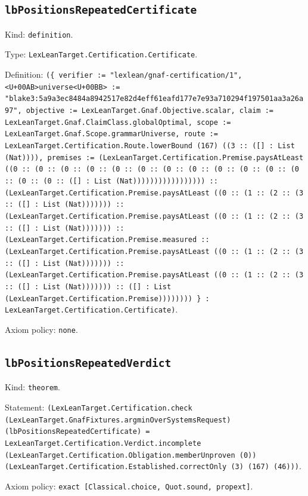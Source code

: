 \documentclass[11pt]{article}
\begin{document}
\subsection*{\texttt{lbPositionsRepeatedCertificate}}
\noindent Kind: \texttt{definition}.\par
\noindent Type: \texttt{LexLeanTarget.Certification.Certificate}.\par
\noindent Definition: \texttt{(\{ verifier := "lexlean/gnaf-certification/1", <U+00AB>universe<U+00BB> := "blake3:5a9a3ec8484a8942517e82d4eff61eafd177e7e93a710294f197501aa3a26a97", objective := LexLeanTarget.Gnaf.Objective.scalar, claim := LexLeanTarget.Gnaf.ClaimClass.globalOptimal, scope := LexLeanTarget.Gnaf.Scope.grammarUniverse, route := LexLeanTarget.Certification.Route.lowerBound (167) ((3 :: ([] : List (Nat)))), premises := (LexLeanTarget.Certification.Premise.paysAtLeast ((0 :: (0 :: (0 :: (0 :: (0 :: (0 :: (0 :: (0 :: (0 :: (0 :: (0 :: (0 :: (0 :: (0 :: ([] : List (Nat))))))))))))))))) :: (LexLeanTarget.Certification.Premise.paysAtLeast ((0 :: (1 :: (2 :: (3 :: ([] : List (Nat))))))) :: (LexLeanTarget.Certification.Premise.paysAtLeast ((0 :: (1 :: (2 :: (3 :: ([] : List (Nat))))))) :: (LexLeanTarget.Certification.Premise.measured :: (LexLeanTarget.Certification.Premise.paysAtLeast ((0 :: (1 :: (2 :: (3 :: ([] : List (Nat))))))) :: (LexLeanTarget.Certification.Premise.paysAtLeast ((0 :: (1 :: (2 :: (3 :: ([] : List (Nat))))))) :: ([] : List (LexLeanTarget.Certification.Premise)))))))) \} : LexLeanTarget.Certification.Certificate)}.\par
\noindent Axiom policy: \texttt{none}.\par
\subsection*{\texttt{lbPositionsRepeatedVerdict}}
\noindent Kind: \texttt{theorem}.\par
\noindent Statement: \texttt{(LexLeanTarget.Certification.check (LexLeanTarget.GnafFixtures.argminOverSystemsRequest) (lbPositionsRepeatedCertificate) = LexLeanTarget.Certification.Verdict.incomplete (LexLeanTarget.Certification.Obligation.memberUnproven (0)) (LexLeanTarget.Certification.Established.correctOnly (3) (167) (46)))}.\par
\noindent Axiom policy: \texttt{exact [Classical.choice, Quot.sound, propext]}.\par
\end{document}

